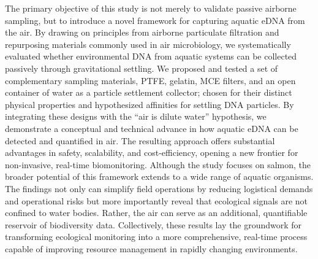 \documentclass{article}
\begin{document}
The primary objective of this study is not merely to validate passive airborne sampling, but to introduce a novel framework for capturing aquatic eDNA from the air. By drawing on principles from airborne particulate filtration and repurposing materials commonly used in air microbiology, we systematically evaluated whether environmental DNA from aquatic systems can be collected passively through gravitational settling. We proposed and tested a set of complementary sampling materials, PTFE, gelatin, MCE filters, and an open container of water as a particle settlement collector; chosen for their distinct physical properties and hypothesized affinities for settling DNA particles. By integrating these designs with the “air is dilute water” hypothesis, we demonstrate a conceptual and technical advance in how aquatic eDNA can be detected and quantified in air. The resulting approach offers substantial advantages in safety, scalability, and cost-efficiency, opening a new frontier for non-invasive, real-time biomonitoring. Although the study focuses on salmon, the broader potential of this framework extends to a wide range of aquatic organisms. The findings not only can simplify field operations by reducing logistical demands and operational risks but more importantly reveal that ecological signals are not confined to water bodies. Rather, the air can serve as an additional, quantifiable reservoir of biodiversity data. Collectively, these results lay the groundwork for transforming ecological monitoring into a more comprehensive, real-time process capable of improving resource management in rapidly changing environments.
\end{document}
